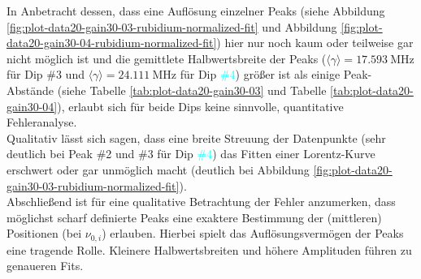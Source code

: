 In Anbetracht dessen, dass eine Auflösung einzelner Peaks (siehe Abbildung \ref{fig:plot-data20-gain30-03-rubidium-normalized-fit} und Abbildung \ref{fig:plot-data20-gain30-04-rubidium-normalized-fit}) hier nur noch kaum oder teilweise gar nicht möglich ist und die gemittlete Halbwertsbreite der Peaks ($\langle \gamma \rangle = \SI{17,593}{\mega \hertz}$ für Dip \textcolor{pink!50!purple}{\#3} und $\langle \gamma \rangle = \SI{24,111}{\mega \hertz}$ für Dip \textcolor{cyan}{\#4}) größer ist als einige Peak-Abstände (siehe Tabelle \ref{tab:plot-data20-gain30-03} und Tabelle \ref{tab:plot-data20-gain30-04}), erlaubt sich für beide Dips keine sinnvolle, quantitative Fehleranalyse. \\
Qualitativ lässt sich sagen, dass eine breite Streuung der Datenpunkte (sehr deutlich bei Peak \#2 und \#3 für Dip \textcolor{cyan}{\#4}) das Fitten einer Lorentz-Kurve erschwert oder gar unmöglich macht (deutlich bei Abbildung \ref{fig:plot-data20-gain30-03-rubidium-normalized-fit}). \\


\noindent Abschließend ist für eine qualitative Betrachtung der Fehler anzumerken, dass möglichst scharf definierte Peaks eine exaktere Bestimmung der (mittleren) Positionen (bei $\nu_{0,i}$) erlauben.
Hierbei spielt das Auflösungsvermögen der Peaks eine tragende Rolle. Kleinere Halbwertsbreiten und höhere Amplituden führen zu genaueren Fits.


\cleardoublepage{}
